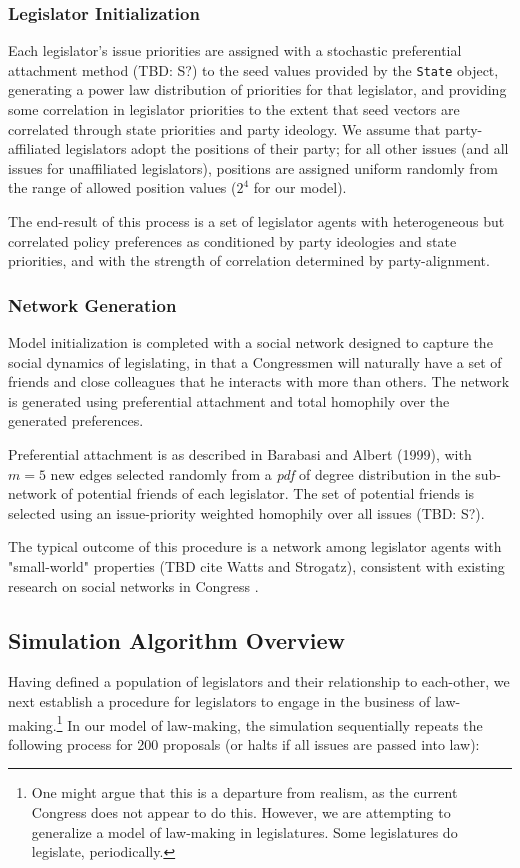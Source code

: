 \documentclass[pdftex,12pt]{llncs}
\begin{document}
\subsubsection{Legislator Initialization}
Each legislator's issue priorities are assigned with a stochastic preferential attachment method  (TBD: S?) to the seed values provided by the \texttt{State} object, generating a power law distribution of priorities for that legislator, and providing some correlation in legislator priorities to the extent that seed vectors are correlated through state priorities and party ideology.
We assume that party-affiliated legislators adopt the positions of their party; for all other issues (and all issues for unaffiliated legislators), positions are assigned uniform randomly from the range of allowed position values ($2^4$ for our model).

The end-result of this process is a set of legislator agents with heterogeneous but correlated policy preferences as conditioned by party ideologies and state priorities, and with the strength of correlation determined by party-alignment.

\subsubsection{Network Generation}
Model initialization is completed with a social network designed to capture the social dynamics of legislating, in that a Congressmen will naturally have a set of friends and close colleagues that he interacts with more than others. 
The network is generated using preferential attachment and total homophily over the generated preferences.
 
Preferential attachment is as described in Barabasi and Albert (1999), with $m=5$ new edges selected randomly from a \textit{pdf} of degree distribution in the sub-network of potential friends of each legislator. 
The set of potential friends is selected using an issue-priority weighted homophily over all issues (TBD: S?).

The typical outcome of this procedure is a network among legislator agents with "small-world" properties (TBD cite Watts and Strogatz), consistent with existing research on social networks in Congress \parencite{Granovetter1978}.

\subsection{Simulation Algorithm Overview}
Having defined a population of legislators and their relationship to each-other, we next establish a procedure for legislators to engage in the business of law-making.\footnote{One might argue that this is a departure from realism, as the current Congress does not appear to do this.
However, we are attempting to generalize a model of law-making in legislatures.
Some legislatures do legislate, periodically.}
In our model of law-making, the simulation sequentially repeats the following process for 200 proposals (or halts if all issues are passed into law):
\end{document}
